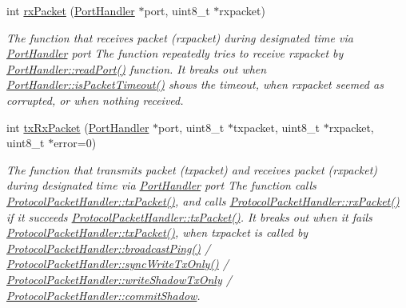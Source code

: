 \begin{DoxyCompactItemize}
int \hyperlink{classmercury_1_1_protocol_packet_handler_a4d124ca43f6a2178497eaaabb9e5907b}{rx\+Packet} (\hyperlink{classmercury_1_1_port_handler}{Port\+Handler} $\ast$port, uint8\+\_\+t $\ast$rxpacket)
\begin{DoxyCompactList}\small\item\em The function that receives packet (rxpacket) during designated time via \hyperlink{classmercury_1_1_port_handler}{Port\+Handler} port  The function repeatedly tries to receive rxpacket by \hyperlink{classmercury_1_1_port_handler_afa6f52d7b95c5ffd8f0c92477d517c79}{Port\+Handler\+::read\+Port()} function.  It breaks out  when \hyperlink{classmercury_1_1_port_handler_a6733438255ede3d34738842e10cd8fc2}{Port\+Handler\+::is\+Packet\+Timeout()} shows the timeout,  when rxpacket seemed as corrupted, or  when nothing received. \end{DoxyCompactList}\item 
int \hyperlink{classmercury_1_1_protocol_packet_handler_a68b02f23af616886d0795ea12debd613}{tx\+Rx\+Packet} (\hyperlink{classmercury_1_1_port_handler}{Port\+Handler} $\ast$port, uint8\+\_\+t $\ast$txpacket, uint8\+\_\+t $\ast$rxpacket, uint8\+\_\+t $\ast$error=0)
\begin{DoxyCompactList}\small\item\em The function that transmits packet (txpacket) and receives packet (rxpacket) during designated time via \hyperlink{classmercury_1_1_port_handler}{Port\+Handler} port  The function calls \hyperlink{classmercury_1_1_protocol_packet_handler_a245f01395d9684bc58788e8a06de3ffc}{Protocol\+Packet\+Handler\+::tx\+Packet()},  and calls \hyperlink{classmercury_1_1_protocol_packet_handler_a4d124ca43f6a2178497eaaabb9e5907b}{Protocol\+Packet\+Handler\+::rx\+Packet()} if it succeeds \hyperlink{classmercury_1_1_protocol_packet_handler_a245f01395d9684bc58788e8a06de3ffc}{Protocol\+Packet\+Handler\+::tx\+Packet()}.  It breaks out  when it fails \hyperlink{classmercury_1_1_protocol_packet_handler_a245f01395d9684bc58788e8a06de3ffc}{Protocol\+Packet\+Handler\+::tx\+Packet()},  when txpacket is called by \hyperlink{classmercury_1_1_protocol_packet_handler_a3cbeb97b8a4a955180a54255a0931d2d}{Protocol\+Packet\+Handler\+::broadcast\+Ping()} / \hyperlink{classmercury_1_1_protocol_packet_handler_a4a08a338c48d6c9ef42183ca74297dce}{Protocol\+Packet\+Handler\+::sync\+Write\+Tx\+Only()} / \hyperlink{classmercury_1_1_protocol_packet_handler_a38b187dbb26583cb57fb7592e4be8136}{Protocol\+Packet\+Handler\+::write\+Shadow\+Tx\+Only} / \hyperlink{classmercury_1_1_protocol_packet_handler_aeb249dda7388331a21d7f765923dbd62}{Protocol\+Packet\+Handler\+::commit\+Shadow}. \end{DoxyCompactList}\item 

\end{DoxyCompactItemize}
